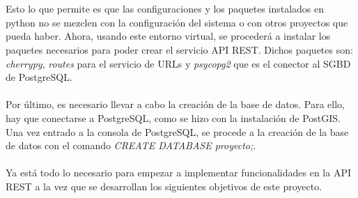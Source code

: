 \\\\
Esto lo que permite es que las configuraciones y los paquetes instalados en python no se mezclen con la configuración del sistema o con otros proyectos que pueda haber. Ahora, usando este entorno virtual, se procederá a instalar los paquetes necesarios para poder crear el servicio API REST. Dichos paquetes son: \textit{cherrypy}, \textit{routes} para el servicio de URLs y \textit{psycopg2} que es el conector al SGBD de PostgreSQL.
\\\\
Por último, es necesario llevar a cabo la creación de la base de datos. Para ello, hay que conectarse a PostgreSQL, como se hizo con la instalación de PostGIS. Una vez entrado a la consola de PostgreSQL, se procede a la creación de la base de datos con el comando \textit{CREATE DATABASE proyecto;}.
\\\\
Ya está todo lo necesario para empezar a implementar funcionalidades en la API REST a la vez que se desarrollan los siguientes objetivos de este proyecto.

